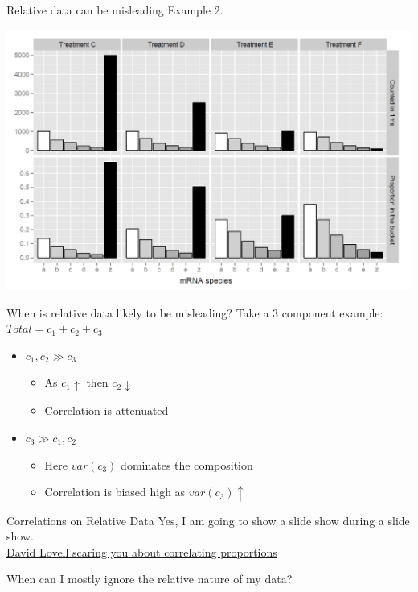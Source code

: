 \documentclass{beamer}\usepackage[]{graphicx}\usepackage[]{color}
\begin{document}
\begin{frame}{Relative data can be misleading}
Example 2.\\
\begin{center}
\includegraphics[scale=.4]{./Figures/AEconstant}
\end{center}
\end{frame}

\begin{frame}{When is relative data likely to be misleading?}
Take a 3 component example: $Total = c_1 + c_2 + c_3$
\pause
\bigskip
\begin{itemize}
\item $c_1, c_2 \gg c_3$
  \begin{itemize}
  \item As $c_1 \uparrow$ then $c_2 \downarrow$
  \item Correlation is attenuated
  \end{itemize}
\pause
\bigskip
\item $c_3 \gg c_1, c_2$
  \begin{itemize}
  \item Here $var\left(c_3\right)$ dominates the composition
  \item Correlation is biased high as $var\left(c_3\right) \uparrow$
  \end{itemize}
\end{itemize}
\end{frame}

\begin{frame}{Correlations on Relative Data}
Yes, I am going to show a slide show during a slide show.\\
\bigskip
\href{http://www.slideshare.net/AustralianBioinformatics/dont-correlate-proportions}{David Lovell scaring you about correlating proportions}
\end{frame}


\begin{frame}{When can I mostly ignore the relative nature of my data?}
\end{frame}
\end{document}
